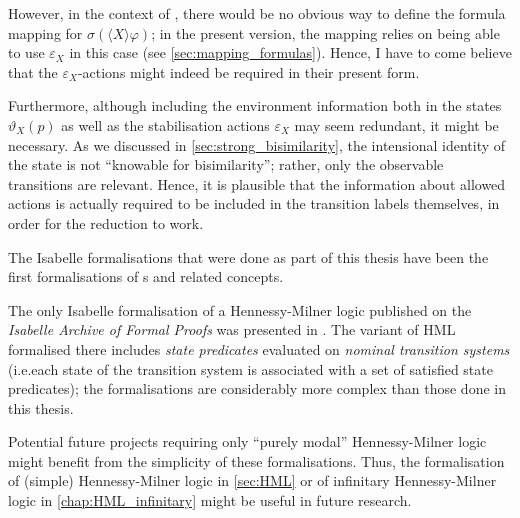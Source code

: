 \begin{isabellebody}
\begin{isamarkuptext}
However, in the context of \HMLt{}, there would be no obvious way to define the formula mapping for $\sigma(\langle X \rangle \varphi)$; in the present version, the mapping relies on being able to use $\varepsilon_X$ in this case (see \cref{sec:mapping_formulas}). Hence, I have to come believe that the $\varepsilon_X$-actions might indeed be required in their present form.

Furthermore, although including the environment information both in the states $\vartheta_X(p)$ as well as the stabilisation actions $\varepsilon_X$ may seem redundant, it might be necessary. As we discussed in \cref{sec:strong_bisimilarity}, the intensional identity of the state is not \enquote{knowable for bisimilarity}; rather, only the observable transitions are relevant. Hence, it is plausible that the information about allowed actions is actually required to be included in the transition labels themselves, in order for the reduction to work.%
\end{isamarkuptext}\isamarkuptrue%
%
\isadelimdocument
%
\endisadelimdocument
%
\isatagdocument
%
\isamarkuptrue%
%
\endisatagdocument
{\isafolddocument}%
%
\isadelimdocument
%
\endisadelimdocument
%
\begin{isamarkuptext}%
The Isabelle formalisations that were done as part of this thesis have been the first formalisations of \LTSt{}s and related concepts. 

The only Isabelle formalisation of a Hennessy-Milner logic published on the \emph{Isabelle Archive of Formal Proofs} was presented in \cite{weber2021modal}.
The variant of HML formalised there includes \emph{state predicates} evaluated on \emph{nominal transition systems} (i.e.\@ each state of the transition system is associated with a set of satisfied state predicates); the formalisations are considerably more complex than those done in this thesis. 

Potential future projects requiring only \enquote{purely modal} Hennessy-Milner logic might benefit from the simplicity of these formalisations. Thus, the formalisation of (simple) Hennessy-Milner logic in \cref{sec:HML} or of infinitary Hennessy-Milner logic in \cref{chap:HML_infinitary} might be useful in future research.%
\end{isamarkuptext}\isamarkuptrue%
%
\isadelimtheory
%
\endisadelimtheory
%
\isatagtheory
%
\endisatagtheory
{\isafoldtheory}%
%
\isadelimtheory
%
\endisadelimtheory
%
\end{isabellebody}%
\endinput
